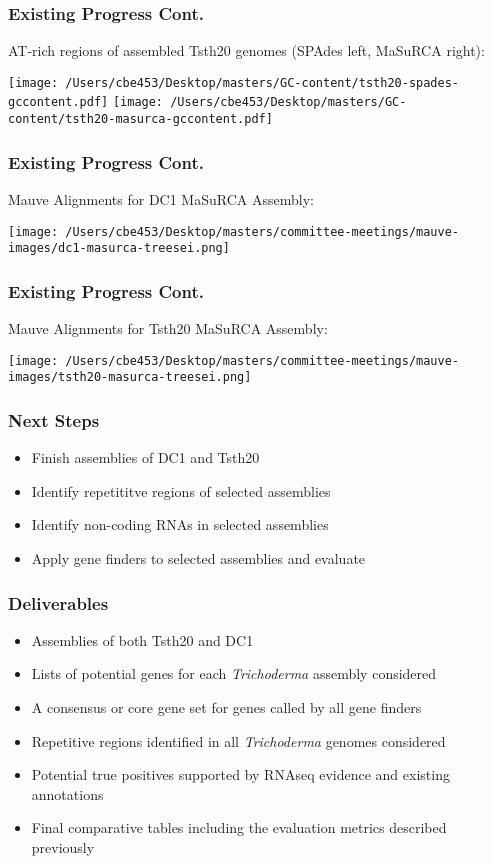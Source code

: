 \documentclass{beamer}
\begin{document}
\begin{frame}
  \frametitle{Existing Progress Cont.}
  AT-rich regions of assembled Tsth20 genomes (SPAdes left, MaSuRCA right):
  \begin{center}
    \texttt{[image: /Users/cbe453/Desktop/masters/GC-content/tsth20-spades-gccontent.pdf]}
    \texttt{[image: /Users/cbe453/Desktop/masters/GC-content/tsth20-masurca-gccontent.pdf]}
  \end{center}
\end{frame}

\begin{frame}
  \frametitle{Existing Progress Cont.}
  Mauve Alignments for DC1 MaSuRCA Assembly:
  \begin{center}
    \texttt{[image: /Users/cbe453/Desktop/masters/committee-meetings/mauve-images/dc1-masurca-treesei.png]}
  \end{center}
\end{frame}

\begin{frame}
  \frametitle{Existing Progress Cont.}
  Mauve Alignments for Tsth20 MaSuRCA Assembly:
  \begin{center}
    \texttt{[image: /Users/cbe453/Desktop/masters/committee-meetings/mauve-images/tsth20-masurca-treesei.png]}
  \end{center}
\end{frame}

\begin{frame}
  \frametitle{Next Steps}
  \begin{itemize}
  \item Finish assemblies of DC1 and Tsth20
  \item Identify repetititve regions of selected assemblies
  \item Identify non-coding RNAs in selected assemblies
  \item Apply gene finders to selected assemblies and evaluate
  \end{itemize}
\end{frame}

\begin{frame}
  \frametitle{Deliverables}
  \begin{itemize}
  \item Assemblies of both Tsth20 and DC1
  \item Lists of potential genes for each \textit{Trichoderma}
    assembly considered
  \item A consensus or core gene set for genes called by all gene
    finders
  \item Repetitive regions identified in all \textit{Trichoderma}
    genomes considered
  \item Potential true positives supported by RNAseq evidence and
    existing annotations
  \item Final comparative tables including the evaluation metrics
    described previously
  \end{itemize}
\end{frame}
\end{document}
